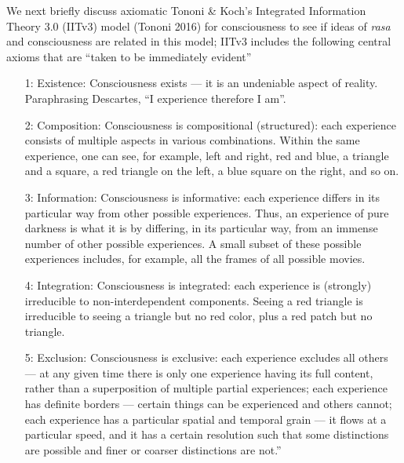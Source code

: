 We next briefly discuss axiomatic Tononi \& Koch’s Integrated Information Theory 3.0 (IITv3) model (Tononi 2016) for consciousness to see if ideas of \textsl{rasa} and consciousness are related in this model; IITv3 includes the following central axioms that are “taken to be immediately evident”
\begin{itemize}
\item[1:] Existence: Consciousness exists --- it is an undeniable aspect of reality. Paraphrasing Descartes, “I experience therefore I am”. 
\item[2:] Composition: Consciousness is compositional (structured): each experience consists of multiple aspects in various combinations. Within the same experience, one can see, for example, left and right, red and blue, a triangle and a square, a red triangle on the left, a blue square on the right, and so on.
\item[3:] Information: Consciousness is informative: each experience differs in its particular way from other possible experiences. Thus, an experience of pure darkness is what it is by differing, in its particular way, from an immense number of other possible experiences. A small subset of these possible experiences includes, for example, all the frames of all possible movies.
\item[4:] Integration: Consciousness is integrated: each experience is (strongly) irreducible to non-interdependent components. Seeing a red triangle is irreducible to seeing a triangle but no red color, plus a red patch but no triangle.
\item[5:] Exclusion: Consciousness is exclusive: each experience excludes all others --- at any given time there is only one experience having its full content, rather than a superposition of multiple partial experiences; each experience has definite borders --- certain things can be experienced and others cannot; each experience has a particular spatial and temporal grain --- it flows at a particular speed, and it has a certain resolution such that some distinctions are possible and finer or coarser distinctions are not.”
\end{itemize}

